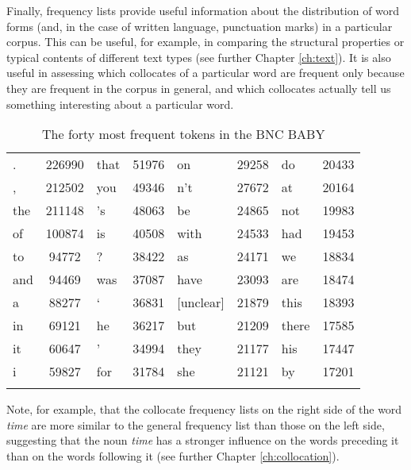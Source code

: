 Finally, frequency lists provide useful information about the distribution of word forms (and, in the case of written language, punctuation marks) in a particular corpus. This can be useful, for example, in comparing the structural properties or typical contents of different text types (see further Chapter \ref{ch:text}). It is also useful in assessing which collocates of a particular word are frequent only because they are frequent in the corpus in general, and which collocates actually tell us something interesting about a particular word. 

\begin{table}[!htbp]
\caption{The forty most frequent tokens in the BNC BABY}
\label{tab:bncbabyfrequencies}
 \begin{tabular}{lS[table-format=6.0]|lS[table-format=6.0]|lS[table-format=6.0]|lS[table-format=6.0]}
   \lsptoprule
.   &   226990   &   that   &   51976   &   on   &   29258   &   do   &   20433 \\
,   &   212502   &   you   &   49346   &   n't   &   27672   &   at   &   20164 \\
the   &   211148   &   's   &   48063   &   be   &   24865   &   not   &   19983 \\
of   &   100874   &   is   &   40508   &   with   &   24533   &   had   &   19453 \\
to   &   94772   &   ?   &   38422   &   as   &   24171   &   we   &   18834 \\
and   &   94469   &   was   &   37087   &   have   &   23093   &   are   &   18474 \\
a   &   88277   &   `   &   36831   &   [unclear]   &   21879   &   this   &   18393 \\
in   &   69121   &   he   &   36217   &   but   &   21209   &   there   &   17585 \\
it   &   60647   &   '   &   34994   &   they   &   21177   &   his   &   17447 \\
i   &   59827   &   for   &   31784   &   she   &   21121   &   by   &   17201 \\
  \lspbottomrule
 \end{tabular}
\end{table}

Note, for example, that the collocate frequency lists on the right side of the word \textit{time} are more similar to the general frequency list than those on the left side, suggesting that the noun \textit{time} has a stronger influence on the words preceding it than on the words following it (see further Chapter \ref{ch:collocation}).

